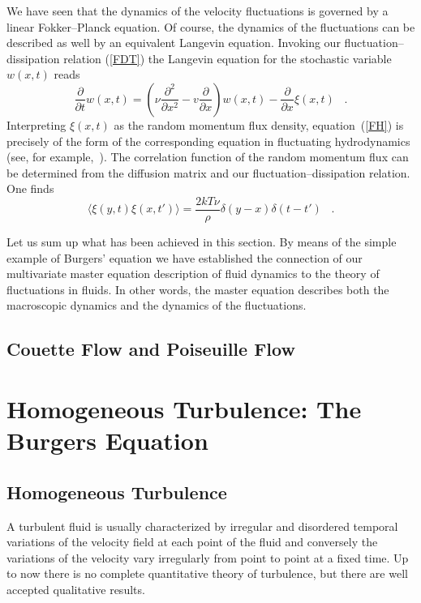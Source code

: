 We have seen that the dynamics of the velocity
fluctuations is governed by a linear Fokker--Planck equation.
Of course, the dynamics of the fluctuations can be described as well by
an equivalent Langevin equation.
Invoking our fluctuation--dissipation relation (\ref{FDT})
the Langevin equation for the
stochastic variable $w(x,t)$ reads
\begin{equation}
\label{FH}
\frac{\partial}{\partial t} w(x,t) =
 \left( \nu \frac{\partial^2}{\partial x^2} -
         v \frac{\partial}{\partial x} \right) w(x,t) -
         \frac{\partial}{\partial x} \xi(x,t)
\;\;\; .
\end{equation}
Interpreting $\xi (x,t)$ as the random momentum flux density,
equation~(\ref{FH}) is precisely of the form
of the corresponding equation in fluctuating hydrodynamics (see, for
example,~\cite{GRABERT,FOX}).
The correlation function of the
random momentum flux  can be determined from the diffusion
matrix and our fluctuation--dissipation relation. One finds
\begin{equation}                                 \label{CORRF}
\langle \xi (y,t) \xi (x,t') \rangle = \frac{2kT \nu}{\rho}
              \delta (y-x) \delta (t-t')
\;\;\; .
\end{equation}

Let us sum up what has been achieved in this section. By means of
the simple example of Burgers' equation we have established the connection
of our multivariate master equation description of fluid dynamics to
the theory of fluctuations in fluids. In other words,
the master equation describes both the macroscopic dynamics and the
dynamics of the fluctuations.

\subsection{Couette Flow and Poiseuille Flow}


\section{Homogeneous Turbulence: The Burgers Equation}
\subsection{Homogeneous Turbulence}
A turbulent fluid is usually characterized by irregular and disordered
temporal variations of the velocity field at each point of the fluid and
conversely  the variations of the velocity vary irregularly from point to
point at a fixed time. Up to now there is no complete quantitative theory of
turbulence, but there are well accepted  qualitative results.

